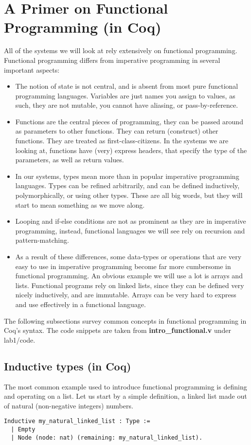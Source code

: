 \documentclass{article}
\begin{document}
\section{A Primer on Functional Programming (in Coq)}
All of the systems we will look at rely extensively on functional programming. Functional programming differs from imperative programming in several important aspects:
\begin{itemize}
    \item The notion of state is not central, and is absent from most pure functional programming languages. Variables are just names you assign to values, as such, they are not mutable, you cannot have aliasing, or pass-by-reference.
    \item Functions are the central pieces of programming, they can be passed around as parameters to other functions. They can return (construct) other functions. They are treated as first-class-citizens. In the systems we are looking at, functions have (very) express headers, that specify the type of the parameters, as well as return values.
    \item In our systems, types mean more than in popular imperative programming languages. Types can be refined arbitrarily, and can be defined inductively, polymorphically, or using other types. These are all big words, but they will start to mean something as we move along.
    \item Looping and if-else conditions are not as prominent as they are in imperative programming, instead, functional languages we will see rely on recursion and pattern-matching.
    \item As a result of these differences, some data-types or operations that are very easy to use in imperative programming become far more cumbersome in functional programming. An obvious example we will use a lot is arrays and lists. Functional programs rely on linked lists, since they can be defined very nicely inductively, and are immutable. Arrays can be very hard to express and use effectively in a functional language.
\end{itemize}

The following subsections survey common concepts in functional programming in Coq's syntax. The code snippets are taken from \textbf{intro\_functional.v} under lab1/code.

\subsection{Inductive types (in Coq)}
The most common example used to introduce functional programming is defining and operating on a list. Let us start by a simple definition, a linked list made out of natural (non-negative integers) numbers. 
\begin{verbatim}
Inductive my_natural_linked_list : Type :=
  | Empty
  | Node (node: nat) (remaining: my_natural_linked_list).
\end{verbatim}
\end{document}

